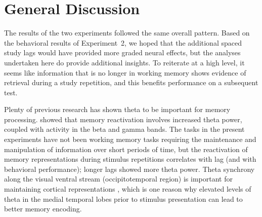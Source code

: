 
\section{General Discussion}


The results of the two experiments followed the same overall pattern.  Based on the behavioral results of Experiment~2, we hoped that the additional spaced study lags would have provided more graded neural effects, but the analyses undertaken here do provide additional insights.  To reiterate at a high level, it seems like information that is no longer in working memory shows evidence of retrieval during a study repetition, and this benefits performance on a subsequent test.

Plenty of previous research has shown theta to be important for memory processing.
 showed that memory reactivation involves increased theta power, coupled with activity in the beta and gamma bands.
The tasks in the present experiments have not been working memory tasks requiring the maintenance and manipulation of information over short periods of time, but the reactivation of memory representations during stimulus repetitions correlates with lag (and with behavioral performance); longer lags showed more theta power.
Theta synchrony along the visual ventral stream (occipitotemporal region) is important for maintaining cortical representations \cite{DuzeEtal2010}, which is one reason why elevated levels of theta in the medial temporal lobes prior to stimulus presentation can lead to better memory encoding.







